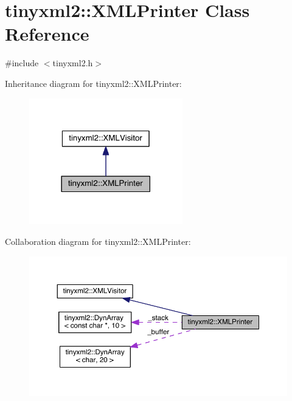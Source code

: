 \hypertarget{classtinyxml2_1_1_x_m_l_printer}{}\section{tinyxml2\+:\+:X\+M\+L\+Printer Class Reference}
\label{classtinyxml2_1_1_x_m_l_printer}


{\ttfamily \#include $<$tinyxml2.\+h$>$}



Inheritance diagram for tinyxml2\+:\+:X\+M\+L\+Printer\+:\nopagebreak
\begin{figure}[H]
\begin{center}
\leavevmode
\includegraphics[width=189pt]{classtinyxml2_1_1_x_m_l_printer__inherit__graph}
\end{center}
\end{figure}


Collaboration diagram for tinyxml2\+:\+:X\+M\+L\+Printer\+:\nopagebreak
\begin{figure}[H]
\begin{center}
\leavevmode
\includegraphics[width=350pt]{classtinyxml2_1_1_x_m_l_printer__coll__graph}
\end{center}
\end{figure}

